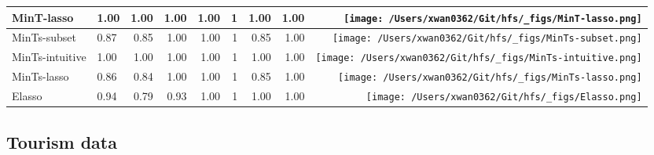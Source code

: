 \documentclass[
  letterpaper,
  DIV=11,
  numbers=noendperiod]{scrartcl}
\begin{document}
\begin{table}[!h]
{\begin{tabular}{llrrrrrr>{}r}
MinT-lasso & 1.00 & 1.00 & 1.00 & 1.00 & 1 & 1.00 & 1.00 & \texttt{[image: /Users/xwan0362/Git/hfs/\_figs/MinT-lasso.png]}\\
\midrule
MinTs-subset & 0.87 & 0.85 & 1.00 & 1.00 & 1 & 0.85 & 1.00 & \texttt{[image: /Users/xwan0362/Git/hfs/\_figs/MinTs-subset.png]}\\
MinTs-intuitive & 1.00 & 1.00 & 1.00 & 1.00 & 1 & 1.00 & 1.00 & \texttt{[image: /Users/xwan0362/Git/hfs/\_figs/MinTs-intuitive.png]}\\
MinTs-lasso & 0.86 & 0.84 & 1.00 & 1.00 & 1 & 0.85 & 1.00 & \texttt{[image: /Users/xwan0362/Git/hfs/\_figs/MinTs-lasso.png]}\\
\midrule
Elasso & 0.94 & 0.79 & 0.93 & 1.00 & 1 & 1.00 & 1.00 & \texttt{[image: /Users/xwan0362/Git/hfs/\_figs/Elasso.png]}\\
\bottomrule
\end{tabular}}
\end{table}

\hypertarget{tourism-data}{%
\subsection{Tourism data}\label{tourism-data}}
\end{document}

